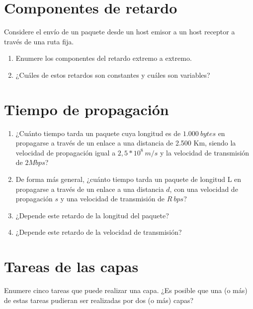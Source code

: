 \documentclass[12pt]{report}
\begin{document}
\section{Componentes de retardo \stwo \steo}
Considere el envío de un paquete desde un host emisor a un host receptor a través de una ruta fija.

\begin{enumerate}
	\item Enumere los componentes del retardo extremo a extremo.
	\item ¿Cuáles de estos retardos son constantes y cuáles son variables?
\end{enumerate}

\section{Tiempo de propagación \sfour}

\begin{enumerate}
	\item ¿Cuánto tiempo tarda un paquete cuya longitud es de $1.000\ bytes$ en propagarse a través de un enlace a una distancia de 2.500 Km, siendo la velocidad de propagación igual a $ 2,5 * 10^{8}\ m/s $ y la velocidad de transmisión de $2 Mbps$?
	\item De forma más general, ¿cuánto tiempo tarda un paquete de longitud L en propagarse a través de un enlace a una distancia $d$, con una velocidad de propagación $s$ y una velocidad de transmisión de $R\ bps$?
	\item ¿Depende este retardo de la longitud del paquete?
	\item ¿Depende este retardo de la velocidad de transmisión?
\end{enumerate}

\section{Tareas de las capas \stwo \steo}
Enumere cinco tareas que puede realizar una capa. ¿Es posible que una (o más) de estas tareas pudieran ser realizadas por dos (o más) capas?
\end{document}
